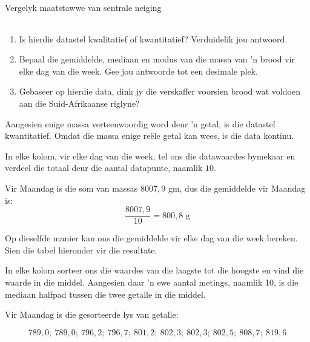 \begin{wex}{
Vergelyk maatstawwe van sentrale neiging
}
{\begin{center}
\begin{tabular}{|c|c|c|c|c|c|c|}
      \end{tabular}
    \end{center}
\begin{minipage}{0.9\textwidth}
    \begin{enumerate}[noitemsep, label=\textbf{\arabic*}.]
    \item Is hierdie datastel kwalitatief of kwantitatief? Verduidelik jou antwoord.
    \item Bepaal die gemiddelde, mediaan en modus van die massa van ’n brood vir elke dag van die week. Gee jou antwoorde tot een desimale plek.
    \item Gebaseer op hierdie data, dink jy die verskaffer voorsien brood wat voldoen aan die Suid-Afrikaanse riglyne?
    \end{enumerate}
\end{minipage}
}{

  Aangesien enige massa verteenwoordig word deur ’n getal, is die datastel kwantitatief. Omdat die massa enige reële getal kan wees, is die data kontinu.


 In elke kolom, vir elke dag van die week, tel ons die datawaardes bymekaar en verdeel die totaal deur die aantal datapunte, naamlik $10$.

  Vir Maandag is die som van massas $8007,9$ gm, dus die gemiddelde vir Maandag is:
  \begin{equation*}
    \frac{8007,9}{10} = 800,8\mbox{ g}
  \end{equation*}

  Op dieselfde manier kan ons die gemiddelde vir elke dag van die week bereken. Sien die tabel hieronder vir die resultate.


  In elke kolom sorteer ons die waardes van die laagste tot die hoogste en vind die waarde in die middel. Aangesien daar ’n ewe aantal metings, naamlik 10, is die mediaan halfpad tussen die twee getalle in die middel.

  Vir Maandag is die gesorteerde lys van getalle:

  \begin{equation*}
    789,0;\ 789,0;\ 796,2;\ 796,7;\ 801,2;\ 802,3;\ 802,3;\ 802,5;\ 808,7;\ 819,6
  \end{equation*}

}
\end{wex}
